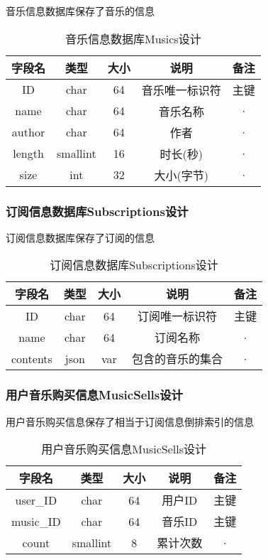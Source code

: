 音乐信息数据库保存了音乐的信息

\begin{table}[htbp]
	\centering
	\caption{音乐信息数据库Musics设计} \label{tab:music-database}
	\begin{tabular}{|c|c|c|c|c|}
		\hline
		字段名 & 类型 & 大小 & 说明 & 备注 \\
		\hline
		ID & char & 64 & 音乐唯一标识符 & 主键\\
		\hline
		name & char & 64 & 音乐名称 & · \\
		\hline
		author & char & 64 & 作者 & · \\
		\hline
		length & smallint & 16 & 时长(秒) & · \\
		\hline
		size & int & 32 & 大小(字节) & · \\
		\hline
	\end{tabular}
\end{table}

\subsubsection{订阅信息数据库Subscriptions设计}

订阅信息数据库保存了订阅的信息

\begin{table}[htbp]
	\centering
	\caption{订阅信息数据库Subscriptions设计} \label{tab:subscription-database}
	\begin{tabular}{|c|c|c|c|c|}
		\hline
		字段名 & 类型 & 大小 & 说明 & 备注 \\
		\hline
		ID & char & 64 & 订阅唯一标识符 & 主键\\
		\hline
		name & char & 64 & 订阅名称 & · \\
		\hline
		contents & json & var & 包含的音乐的集合  & · \\
		\hline
	\end{tabular}
\end{table}

\subsubsection{用户音乐购买信息MusicSells设计}

用户音乐购买信息保存了相当于订阅信息倒排索引的信息

\begin{table}[htbp]
	\centering
	\caption{用户音乐购买信息MusicSells设计} \label{tab:music-sell-database}
	\begin{tabular}{|c|c|c|c|c|}
		\hline
		字段名 & 类型 & 大小 & 说明 & 备注 \\
		\hline
		user\_ID & char & 64 & 用户ID & 主键\\
		\hline
		music\_ID & char & 64 & 音乐ID & 主键 \\
		\hline
		count & smallint & 8 & 累计次数  & · \\
		\hline
	\end{tabular}
\end{table}

